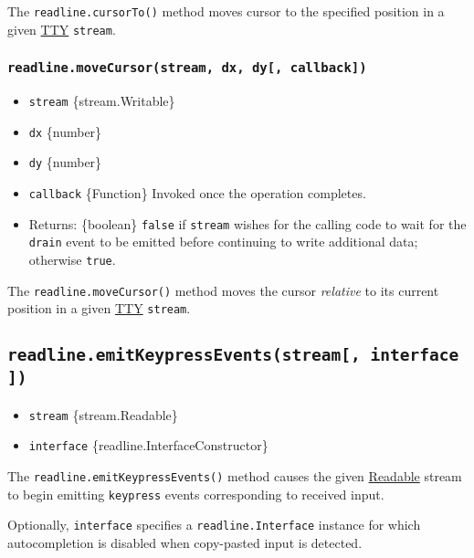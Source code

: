 The \texttt{readline.cursorTo()} method moves cursor to the specified
position in a given \href{tty.md}{TTY} \texttt{stream}.

\subsubsection{\texorpdfstring{\texttt{readline.moveCursor(stream,\ dx,\ dy{[},\ callback{]})}}{readline.moveCursor(stream, dx, dy{[}, callback{]})}}\label{readline.movecursorstream-dx-dy-callback}

\begin{itemize}
\tightlist
\item
  \texttt{stream} \{stream.Writable\}
\item
  \texttt{dx} \{number\}
\item
  \texttt{dy} \{number\}
\item
  \texttt{callback} \{Function\} Invoked once the operation completes.
\item
  Returns: \{boolean\} \texttt{false} if \texttt{stream} wishes for the
  calling code to wait for the
  \texttt{\textquotesingle{}drain\textquotesingle{}} event to be emitted
  before continuing to write additional data; otherwise \texttt{true}.
\end{itemize}

The \texttt{readline.moveCursor()} method moves the cursor
\emph{relative} to its current position in a given \href{tty.md}{TTY}
\texttt{stream}.

\subsection{\texorpdfstring{\texttt{readline.emitKeypressEvents(stream{[},\ interface{]})}}{readline.emitKeypressEvents(stream{[}, interface{]})}}\label{readline.emitkeypresseventsstream-interface}

\begin{itemize}
\tightlist
\item
  \texttt{stream} \{stream.Readable\}
\item
  \texttt{interface} \{readline.InterfaceConstructor\}
\end{itemize}

The \texttt{readline.emitKeypressEvents()} method causes the given
\href{stream.md\#readable-streams}{Readable} stream to begin emitting
\texttt{\textquotesingle{}keypress\textquotesingle{}} events
corresponding to received input.

Optionally, \texttt{interface} specifies a \texttt{readline.Interface}
instance for which autocompletion is disabled when copy-pasted input is
detected.

